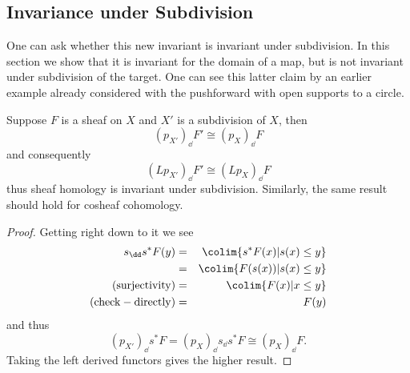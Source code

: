 \subsection{Invariance under Subdivision}

One can ask whether this new invariant is invariant under subdivision. In this section we show that it is invariant for the domain of a map, but is not invariant under subdivision of the target. One can see this latter claim by an earlier example already considered with the pushforward with open supports to a circle.

\begin{thm}
  Suppose $F$ is a sheaf on $X$ and $X'$ is a subdivision of $X$, then
\[
 (p_{X'})_{\dd}F'\cong (p_{X})_{\dd}F
\]
and consequently
\[
 (Lp_{X'})_{\dd}F'\cong (Lp_X)_{\dd}F
\]
thus sheaf homology is invariant under subdivision. Similarly, the same result should hold for cosheaf cohomology.
\end{thm}
\begin{proof}
Getting right down to it we see
\begin{eqnarray*}
 s_{\dd}s^*F(y) &=& \colim \{s^*F(x) |s(x)\leq y\} \\
&=& \colim \{ F(s(x)) | s(x)\leq y\} \\
(\mathrm{surjectivity})&=&\colim \{F(x) | x\leq y\} \\
(\mathrm{check-directly})&=& F(y)
\end{eqnarray*}
and thus
$$(p_{X'})_{\dd}s^*F=(p_X)_{\dd}s_{\dd}s^*F \cong (p_X)_{\dd}F.$$
Taking the left derived functors gives the higher result.
\end{proof}

